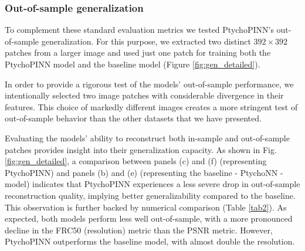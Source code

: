 \documentclass[sn-mathphys]{sn-jnl}%
\theoremstyle{thmstyleone}%
\theoremstyle{thmstyletwo}%
\theoremstyle{thmstylethree}%
\begin{document}
\subsubsection{Out-of-sample generalization}
To complement these standard evaluation metrics we tested PtychoPINN's out-of-sample generalization. For this purpose, we extracted two distinct $392 \times 392$ patches from a larger image and used just one patch for training both the PtychoPINN model and the baseline model (Figure \ref{fig:gen_detailed}).

In order to provide a rigorous test of the models' out-of-sample performance, we intentionally selected two image patches with considerable divergence in their features. This choice of markedly different images creates a more stringent test of out-of-sample behavior than the other datasets that we have presented.

Evaluating the models' ability to reconstruct both in-sample and out-of-sample patches provides insight into their generalization capacity. As shown in Fig. \ref{fig:gen_detailed}, a comparison between panels (c) and (f) (representing PtychoPINN) and panels (b) and (e) (representing the baseline - PtychoNN - model) indicates that PtychoPINN experiences a less severe drop in out-of-sample reconstruction quality, implying better generalizability compared to the baseline. This observation is further backed by numerical comparison (Table \ref{tab2}). As expected, both models perform less well out-of-sample, with a more pronounced decline in the FRC50 (resolution) metric than the PSNR metric. However, PtychoPINN outperforms the baseline model, with almost double the resolution.


\end{document}
